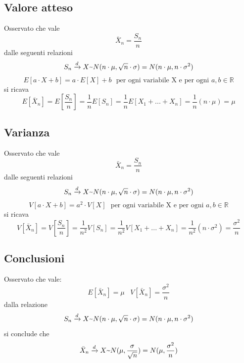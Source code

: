 \subsection{Valore atteso}
Osservato che vale
\[
\bar{X}_n = \frac{S_n}{n}
\]
dalle seguenti relazioni
\begin{equation*}
S_n \xrightarrow{d} X \textapprox N(n \cdot \mu, \sqrt{n} \cdot \sigma) = N(n \cdot \mu, n \cdot \sigma^2)
\end{equation*}
\begin{equation*}
	E[a \cdot X + b] = a \cdot E[X] + b \, \, \, \, \text{per ogni variabile X e per ogni } a, b \in \mathbb{R}
\end{equation*}
si ricava
\begin{equation}
	E[\bar{X}_n] = E[\frac{S_n}{n}] = \frac{1}{n} E[S_n] = \frac{1}{n}E[X_1 + ... + X_n] = \frac{1}{n} (n \cdot \mu) = \mu
\end{equation}


\subsection{Varianza}
Osservato che vale
\[
\bar{X}_n = \frac{S_n}{n}
\]
dalle seguenti relazioni
\begin{equation*}
S_n \xrightarrow{d} X \textapprox N(n \cdot \mu, \sqrt{n} \cdot \sigma) = N(n \cdot \mu, n \cdot \sigma^2)
\end{equation*}
\begin{equation*}
V[a \cdot X + b] = a^2 \cdot V[X] \, \, \, \, \text{per ogni variabile X e per ogni } a, b \in \mathbb{R}
\end{equation*}
si ricava
\begin{equation}
V[\bar{X}_n] = V[\frac{S_n}{n}] = \frac{1}{n^2} V[S_n] = \frac{1}{n^2}V[X_1 + ... + X_n] = \frac{1}{n^2} (n \cdot \sigma^2) = \frac{\sigma^2}{n}
\end{equation}

\subsection{Conclusioni}
Osservato che vale:
\[
E[\bar{X}_n] = \mu  \; \; \; V[\bar{X}_n] =  \frac{\sigma^2}{n}
\]
dalla relazione 
\begin{equation*}
S_n \xrightarrow{d} X \textapprox N(n \cdot \mu, \sqrt{n} \cdot \sigma) = N(n \cdot \mu, n \cdot \sigma^2)
\end{equation*}
si conclude che 
\begin{equation}
	\bar{X}_n \xrightarrow{d} X \textapprox N(\mu, \frac{\sigma}{\sqrt{n}}) = N(\mu, \frac{\sigma^2}{n}) 
\end{equation}

